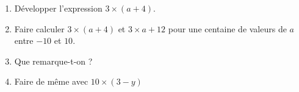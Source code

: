 
\begin{exercice}\label{exo2smath-0210}

    \begin{enumerate}
        \item
            Développer l'expression \( 3\times (a+4)\).
        \item
            Faire calculer \( 3\times (a+4)\) et \( 3\times a+12\) pour une centaine de valeurs de \( a\) entre \( -10\) et \( 10\).
        \item
            Que remarque-t-on ?
        \item
            Faire de même avec \( 10\times (3-y)\)
    \end{enumerate}

\end{exercice}
